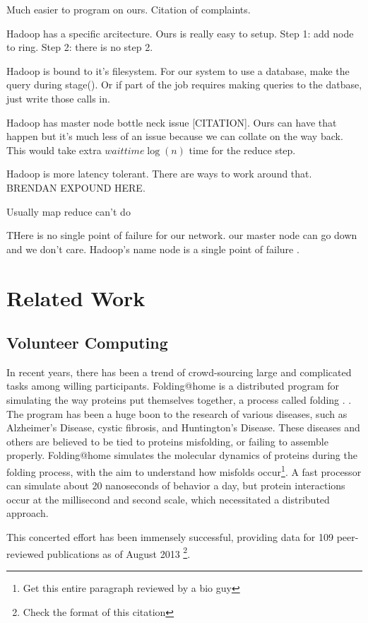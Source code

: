 \documentclass[conference, compsocconf, letterpaper]{IEEEtran}
\begin{document}
Much easier to program on ours. Citation of complaints.

Hadoop has a specific arcitecture.  Ours is really easy to setup.  Step 1: add node to ring. Step 2: there is no step 2.

Hadoop is bound to it's filesystem. For our system to use a database, make the query during stage().  Or if part of the job requires making queries to the datbase, just write those calls in.

Hadoop has master node bottle neck issue [CITATION].  Ours can have that happen but it's much less of an issue because we can collate on the way back.   This would take extra  $waittime \log(n)$ time for the reduce step. 

Hadoop is more latency tolerant.  There are ways to work around that.  BRENDAN EXPOUND HERE.

Usually map reduce can't do 

THere is no single point of failure for our network.  our master node can go down and we don't care. Hadoop's name node is a single point of failure \cite{shvachko2010hadoop}.

\section{Related Work}

\subsection{Volunteer Computing}
In recent years, there has been a trend of crowd-sourcing large and complicated tasks among willing participants.  Folding@home is a distributed program for simulating the way proteins put themselves together, a process called folding \cite{folding}.  \cite{folding}.  The program has been a huge boon to the research of various diseases, such as Alzheimer's Disease, cystic fibrosis, and Huntington's Disease.  These diseases and others are believed to be tied to proteins misfolding, or failing to assemble properly.  Folding@home simulates the molecular dynamics of proteins during the folding process, with the aim to understand  how misfolds occur\footnote{Get this entire paragraph reviewed by a bio guy}.  A fast processor can simulate about 20 nanoseconds of behavior a day, but protein interactions occur at the millisecond and second scale, which necessitated a distributed approach.  

This concerted effort has been immensely successful, providing data for 109 peer-reviewed publications as of August 2013 \cite{foldingPapers}\footnote{Check the format of this citation}.
\end{document}
